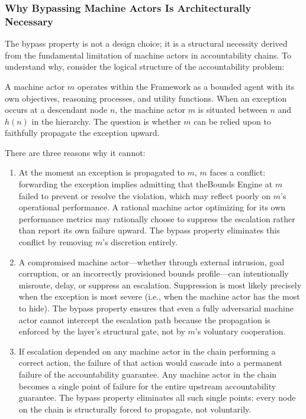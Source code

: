\subsubsection*{Why Bypassing Machine Actors Is Architecturally Necessary}

The bypass property is not a design choice; it is a structural necessity derived from the fundamental limitation of machine actors in accountability chains. To understand why, consider the logical structure of the accountability problem:

A machine actor $m$ operates within the \bxthree{} Framework as a bounded agent with its own objectives, reasoning processes, and utility functions. When an exception occurs at a descendant node $n$, the machine actor $m$ is situated between $n$ and $h(n)$ in the hierarchy. The question is whether $m$ can be relied upon to faithfully propagate the exception upward.

There are three reasons why it cannot:

\begin{enumerate}
\item[\textbf{Machine actors have competing interests.}] At the moment an exception is propagated to $m$, $m$ faces a conflict: forwarding the exception implies admitting that theBounds Engine at $m$ failed to prevent or resolve the violation, which may reflect poorly on $m$'s operational performance. A rational machine actor optimizing for its own performance metrics may rationally choose to suppress the escalation rather than report its own failure upward. The bypass property eliminates this conflict by removing $m$'s discretion entirely.

\item[\textbf{Machine actors can be adversarially compromised.}] A compromised machine actor---whether through external intrusion, goal corruption, or an incorrectly provisioned bounds profile---can intentionally misroute, delay, or suppress an escalation. Suppression is most likely precisely when the exception is most severe (i.e., when the machine actor has the most to hide). The bypass property ensures that even a fully adversarial machine actor cannot intercept the escalation path because the propagation is enforced by the \fact{} layer's structural gate, not by $m$'s voluntary cooperation.

\item[\textbf{Machine actors create single points of failure.}] If escalation depended on any machine actor in the chain performing a correct action, the failure of that action would cascade into a permanent failure of the accountability guarantee. Any machine actor in the chain becomes a single point of failure for the entire upstream accountability guarantee. The bypass property eliminates all such single points: every node on the chain is structurally forced to propagate, not voluntarily.
\end{enumerate}

